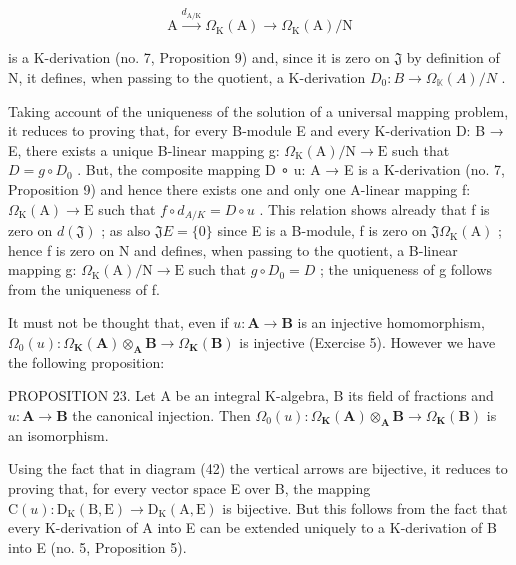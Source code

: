 \[
\mathrm{A} \xrightarrow {d _ {\mathrm{A} / \mathrm{K}}} \Omega_ {\mathrm{K}} (\mathrm{A}) \longrightarrow \Omega_ {\mathrm{K}} (\mathrm{A}) / \mathrm{N}
\]

is a K-derivation (no. 7, Proposition 9) and, since it is zero on \(\mathfrak{J}\) by definition of N, it defines, when passing to the quotient, a K-derivation \(D_0:B\to \Omega_{\mathbb{K}}(A) / N\) .

Taking account of the uniqueness of the solution of a universal mapping problem, it reduces to proving that, for every B-module E and every K-derivation D: B → E, there exists a unique B-linear mapping g: \(\Omega_{\mathrm{K}}(\mathrm{A})/\mathrm{N} \rightarrow \mathrm{E}\) such that \(D = g \circ D_{0}\) . But, the composite mapping D ∘ u: A → E is a K-derivation (no. 7, Proposition 9) and hence there exists one and only one A-linear mapping f: \(\Omega_{\mathrm{K}}(\mathrm{A}) \rightarrow \mathrm{E}\) such that \(f \circ d_{A/K} = D \circ u\) . This relation shows already that f is zero on \(d(\mathfrak{J})\) ; as also \(\mathfrak{J} E = \{0\}\) since E is a B-module, f is zero on \(\mathfrak{J} \Omega_{\mathrm{K}}(\mathrm{A})\) ; hence f is zero on N and defines, when passing to the quotient, a B-linear mapping g: \(\Omega_{\mathrm{K}}(\mathrm{A})/\mathrm{N} \rightarrow \mathrm{E}\) such that \(g \circ D_{0} = D\) ; the uniqueness of g follows from the uniqueness of f.

It must not be thought that, even if \(u: \mathbf{A} \to \mathbf{B}\) is an injective homomorphism, \(\Omega_0(u): \Omega_{\mathbf{K}}(\mathbf{A}) \otimes_{\mathbf{A}} \mathbf{B} \to \Omega_{\mathbf{K}}(\mathbf{B})\) is injective (Exercise 5). However we have the following proposition:

PROPOSITION 23. Let A be an integral K-algebra, B its field of fractions and \(u: \mathbf{A} \to \mathbf{B}\) the canonical injection. Then \(\Omega_0(u): \Omega_{\mathbf{K}}(\mathbf{A}) \otimes_{\mathbf{A}} \mathbf{B} \to \Omega_{\mathbf{K}}(\mathbf{B})\) is an isomorphism.

Using the fact that in diagram (42) the vertical arrows are bijective, it reduces to proving that, for every vector space E over B, the mapping \(\mathrm{C}(u):\mathrm{D}_{\mathrm{K}}(\mathrm{B},\mathrm{E})\to\mathrm{D}_{\mathrm{K}}(\mathrm{A},\mathrm{E})\) is bijective. But this follows from the fact that every K-derivation of A into E can be extended uniquely to a K-derivation of B into E (no. 5, Proposition 5).

